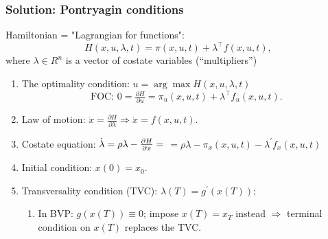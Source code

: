 \documentclass[bigger,handout]{beamer}
\begin{document}
\begin{frame}%
 
\frametitle{Solution: Pontryagin conditions}

Hamiltonian = "Lagrangian for functions":%
\begin{equation*}
H(x,u,\lambda ,t)=\pi (x,u,t)+\lambda ^{\top }f(x,u,t),
\end{equation*}%
where $\lambda \in R^{n}$ is a vector of costate variables
(\textquotedblleft multipliers\textquotedblright )

\begin{enumerate}
\item The optimality condition: $u=\arg\max H(x,u,\lambda ,t)$ 
\begin{equation*}
\text{FOC: }0=\tfrac{\partial H}{\partial u}=\pi _{u}(x,u,t)+\lambda ^{\top
}f_{u}(x,u,t).
\end{equation*}

\item Law of motion: $\dot{x}=\frac{\partial H}{\partial \lambda }%
\Rightarrow \dot{x}=f(x,u,t)$.

\item Costate equation: $\dot{\lambda}=\rho \lambda -\frac{\partial H}{%
\partial x}=$\newline
$=\rho \lambda -\pi _{x}(x,u,t)-\lambda ^{\prime }f_{x}(x,u,t)$

\item Initial condition: $x(0)=x_{0}.$

\item Transversality condition (TVC): $\lambda (T)=g^{\prime }(x(T));$

\begin{enumerate}
\item In BVP: $g(x(T))\equiv 0$; impose $x(T)=x_{T}$ instead \newline
$\Rightarrow $ terminal condition on $x(T)$ replaces the TVC.
\end{enumerate}
\end{enumerate}

 
 
\end{frame}%
 
 
 
\end{document}
